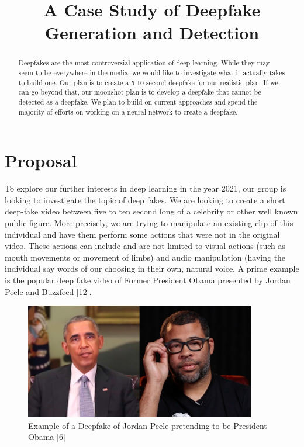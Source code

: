 \documentclass{article}
\title{A Case Study of Deepfake Generation and Detection}
\begin{document}
\maketitle

\begin{abstract}
Deepfakes are the most controversial application of deep learning. While they may seem to be everywhere in the media, we would like to investigate what it actually takes to build one. Our plan is to create a 5-10 second deepfake for our realistic plan. If we can go beyond that, our moonshot plan is to develop a deepfake that cannot be detected as a deepfake. We plan to build on current approaches and spend the majority of efforts on working on a neural network to create a deepfake.  
\end{abstract}

\section{Proposal}

To explore our further interests in deep learning in the year 2021, our group is looking to investigate the topic of deep fakes. We are looking to create a short deep-fake video between five to ten second long of a celebrity or other well known public figure. More precisely, we are trying to manipulate an existing clip of this individual and have them perform some actions that were not in the original video. These actions can include and are not limited to visual actions (such as mouth movements or movement of limbs) and audio manipulation (having the individual say words of our choosing in their own, natural voice. A prime example is the popular deep fake video of Former President Obama presented by Jordan Peele and Buzzfeed [12]. 

\begin{figure}[h]
\caption{Example of a Deepfake of Jordan Peele pretending to be President Obama [6]}
\centering
\includegraphics[width=0.9\textwidth]{Brobama.png}
\end{figure}
\end{document}
